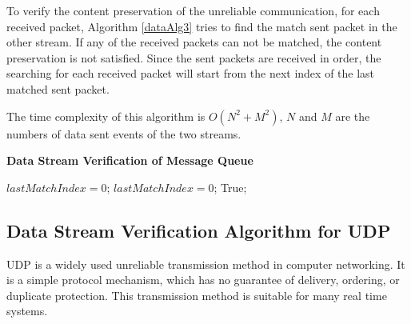 To verify the content preservation of the unreliable communication, for each received packet, Algorithm \ref{dataAlg3} tries to find the match sent packet in the other stream. If any of the received packets can not be matched, the content preservation is not satisfied. Since the sent packets are received in order, the searching for each received packet will start from the next index of the last matched sent packet. 

The time complexity of this algorithm is $O(N^2+M^2)$, $N$ and $M$ are the numbers of data sent events of the two streams.

\begin{algorithm}[H]
\DontPrintSemicolon
\caption{{\bf Data Stream Verification of Message Queue } \label{dataAlg3}}
\;
$lastMatchIndex = 0$;\;
$lastMatchIndex = 0$;\;
 \KwRet True;\;
\end{algorithm} 

\subsection{Data Stream Verification Algorithm for UDP}
UDP is a widely used unreliable transmission method in computer networking. It is a simple protocol mechanism, which has no guarantee of delivery, ordering, or duplicate protection. This transmission method is suitable for many real time systems. 


